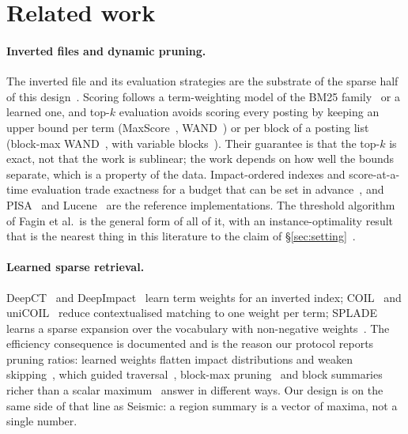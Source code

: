 \section{Related work}
\label{sec:related}

\paragraph{Inverted files and dynamic pruning.}
The inverted file and its evaluation strategies are the substrate of the sparse
half of this design~\cite{zobel2006inverted}. Scoring follows a
term-weighting model of the BM25 family~\cite{robertson2009bm25} or a learned
one, and top-$k$ evaluation avoids scoring every posting by keeping an upper
bound per term (MaxScore~\cite{turtle1995maxscore},
WAND~\cite{broder2003wand}) or per block of a posting list (block-max
WAND~\cite{ding2011bmw}, with variable blocks~\cite{mallia2017vbmw}). Their
guarantee is that the top-$k$ is exact, not that the work is sublinear; the
work depends on how well the bounds separate, which is a property of the data.
Impact-ordered indexes and score-at-a-time evaluation trade exactness for a
budget that can be set in advance~\cite{anh2002impact,lin2015anytime}, and
PISA~\cite{mallia2019pisa} and Lucene~\cite{lucene} are the reference
implementations. The threshold algorithm of Fagin et al.\ is the general form
of all of it, with an instance-optimality result that is the nearest thing in
this literature to the claim of \S\ref{sec:setting}~\cite{fagin2003ta}.

\paragraph{Learned sparse retrieval.}
DeepCT~\cite{dai2020deepct} and DeepImpact~\cite{mallia2021deepimpact} learn
term weights for an inverted index; COIL~\cite{gao2021coil} and
uniCOIL~\cite{lin2021unicoil} reduce contextualised matching to one weight per
term; SPLADE learns a sparse expansion over the vocabulary with non-negative
weights~\cite{formal2021splade,formal2021spladev2,formal2022spladepp}. The
efficiency consequence is documented and is the reason our protocol reports
pruning ratios: learned weights flatten impact distributions and weaken
skipping~\cite{mackenzie2021wacky,lassance2022efficiency}, which guided
traversal~\cite{mallia2022guided}, block-max pruning~\cite{mallia2024bmp} and
block summaries richer than a scalar maximum~\cite{bruch2024seismic} answer in
different ways. Our design is on the same side of that line as Seismic: a
region summary is a vector of maxima, not a single number.

